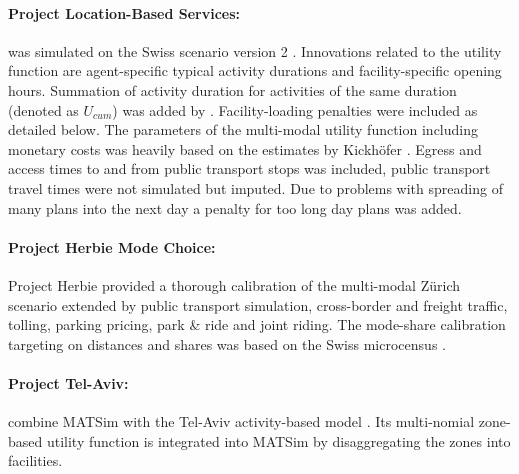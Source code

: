 \paragraph{Project Location-Based Services:}
\citet[][]{BalmerEtAl_ResRep_datapuls_2010} was simulated on the Swiss scenario version 2 \citep[][]{HorniEtAl_TechRep_IVT_2011_a}. Innovations related to the utility function are agent-specific typical activity durations and facility-specific opening hours. Summation of activity duration for activities of the same duration (denoted as $U_{cum}$) was added by \citet[][p.9 and p.28]{BalmerEtAl_ResRep_datapuls_2010}. Facility-loading penalties were included as detailed below. The parameters \citep[][Table 2 on p.31]{BalmerEtAl_ResRep_datapuls_2010} of the multi-modal utility function including monetary costs was heavily based on the estimates by Kickhöfer \citep[][]{Kickhoefer_MastersThesis_2009}. Egress and access times to and from public transport stops was included, public transport travel times were not simulated but imputed. Due to problems with spreading of many plans into the next day a penalty for too long day plans was added.

\paragraph{Project Herbie Mode Choice:}
Project Herbie \citep[][]{VitinsEtAl_VW_2012} provided a thorough calibration of the multi-modal Zürich scenario extended by public transport simulation, cross-border and freight traffic, tolling, parking pricing, park \& ride and joint riding. The mode-share calibration targeting on distances and shares was based on the Swiss microcensus \citep[][p.18]{VitinsEtAl_VW_2012}.   

\paragraph{Project Tel-Aviv:}
\citet[][]{BekhorEtAl_TRB_2011, DoblerEtAl_TechRep_IVT_2014} combine MATSim with the Tel-Aviv activity-based model \citep[][]{CambrigeSystemsInc_ResRep_TelAviv_2008}. Its multi-nomial zone-based utility function is integrated into MATSim by disaggregating the zones into facilities.

